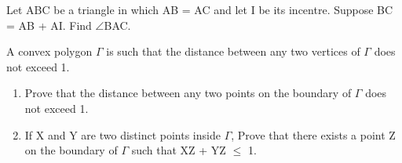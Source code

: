 \item Let ABC be a triangle in which AB = AC and let I be its incentre. Suppose BC = AB + AI. Find $\angle$BAC.

\item A convex polygon $\Gamma$ is such that the distance between any two vertices of $\Gamma$ does not exceed 1.
\begin{enumerate}
\item Prove that the distance between any two points on the boundary of $\Gamma$ does not exceed 1.
\item If X and Y are two distinct points inside $\Gamma$, Prove that there exists a point Z on the boundary of $\Gamma$ such that XZ + YZ $\leq$ 1.
\end{enumerate}
